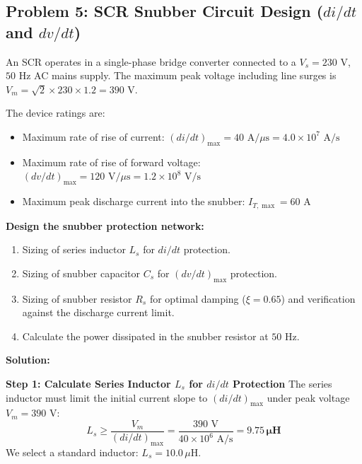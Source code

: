 \documentclass[11pt,a4paper]{article}
\begin{document}
\subsection{Problem 5: SCR Snubber Circuit Design ($di/dt$ and $dv/dt$)}

\begin{examplebox}
An SCR operates in a single-phase bridge converter connected to a $V_s = 230\text{ V}$, $50\text{ Hz}$ AC mains supply. The maximum peak voltage including line surges is $V_m = \sqrt{2} \times 230 \times 1.2 = 390\text{ V}$.

The device ratings are:
\begin{itemize}[leftmargin=*]
  \item Maximum rate of rise of current: $(di/dt)_{\max} = 40\text{ A}/\mu\text{s} = 4.0 \times 10^7\text{ A/s}$
  \item Maximum rate of rise of forward voltage: $(dv/dt)_{\max} = 120\text{ V}/\mu\text{s} = 1.2 \times 10^8\text{ V/s}$
  \item Maximum peak discharge current into the snubber: $I_{T,\max} = 60\text{ A}$
\end{itemize}

\textbf{Design the snubber protection network:}
\begin{enumerate}[label=(\alph*)]
  \item Sizing of series inductor $L_s$ for $di/dt$ protection.
  \item Sizing of snubber capacitor $C_s$ for $(dv/dt)_{\max}$ protection.
  \item Sizing of snubber resistor $R_s$ for optimal damping ($\xi = 0.65$) and verification against the discharge current limit.
  \item Calculate the power dissipated in the snubber resistor at $50\text{ Hz}$.
\end{enumerate}

\tcblower
\textbf{Solution:}

\textbf{Step 1: Calculate Series Inductor $L_s$ for $di/dt$ Protection}
The series inductor must limit the initial current slope to $(di/dt)_{\max}$ under peak voltage $V_m = 390\text{ V}$:
\begin{equation}
L_s \ge \frac{V_m}{(di/dt)_{\max}} = \frac{390\text{ V}}{40 \times 10^6\text{ A/s}} = \mathbf{9.75\,\mu\text{H}}
\end{equation}
We select a standard inductor: $L_s = 10.0\,\mu\text{H}$.


\end{examplebox}
\end{document}
